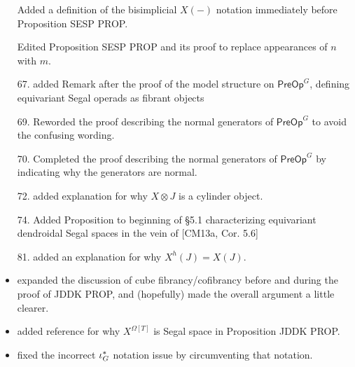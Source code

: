 \documentclass{article}
\begin{document}
\begin{itemize}
Added a definition of the bisimplicial $X(-)$ notation immediately before Proposition SESP PROP.

Edited Proposition SESP PROP and its proof to replace appearances of $n$ with $m$.

\item[67.] added Remark after the proof of the model structure on $\mathsf{PreOp}^G$, defining equivariant Segal operads as fibrant objects

\item[69.] Reworded the proof describing the normal generators of $\mathsf{PreOp}^G$ to avoid the confusing wording.

\item[70.] Completed the proof describing the normal generators of $\mathsf{PreOp}^G$ by indicating why the generators are normal.

\item[72.] added explanation for why $X \otimes J$ is a cylinder object.

\item[74.] Added Proposition to beginning of \S 5.1 characterizing equivariant dendroidal Segal spaces in the vein of [CM13a, Cor. 5.6]

\item[81.] added an explanation for why $X^h(J) = X(J)$.


\item expanded the discussion of cube fibrancy/cofibrancy before and during the proof of JDDK PROP, and (hopefully) made the overall argument a little clearer.

\item added reference for why $X^{\Omega[T]}$ is Segal space in Proposition JDDK PROP.

\item fixed the incorrect $\iota^{\**}_G$ notation issue by circumventing that notation.

\end{itemize}
\end{document}
